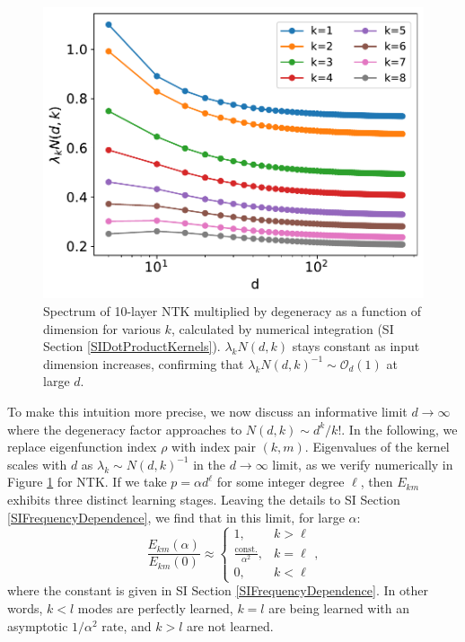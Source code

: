 \documentclass{article}
\begin{document}
\begin{figure}[tb]
\centering
\includegraphics[width=0.8
\linewidth]{ntk_spectrum_dim.pdf}
\caption{\label{fig:NTK_spectrum_dependence} Spectrum of 10-layer NTK multiplied by degeneracy as a function of dimension for various $k$, calculated by numerical integration (SI Section \ref{SIDotProductKernels}). $\lambda_k N(d,k)$ stays constant as input dimension increases, confirming that $\lambda_k N(d,k)^{-1}\sim \mathcal{O}_d(1)$ at large $d$.}
\end{figure}

To make this intuition more precise, we now discuss an informative limit $d\to\infty$ where the degeneracy factor approaches to $N(d,k) \sim {d^k}/{k!}$.  In the following, we replace eigenfunction index $\rho$ with index pair $(k,m)$. Eigenvalues of the kernel scales with $d$ as $\lambda_k \sim N(d,k)^{-1}$ \cite{smola2001dotproduct} in the $d \to \infty$ limit, as we verify numerically in Figure \ref{fig:NTK_spectrum_dependence} for NTK. If %
we take $p=\alpha d^\ell$ for some integer degree $\ell$, then $E_{km}$  exhibits three distinct learning stages. Leaving the details to SI Section \ref{SIFrequencyDependence},
we find that in this limit, for large $\alpha$:
\begin{equation}
\frac{E_{km}(\alpha)}{E_{km}(0)} \approx \left\{\begin{array}{ll}1,& k>\ell \\
 \frac{\text{const.}}{\alpha^2} ,& k=\ell \\
0, & k<\ell\end{array} \right.,
\end{equation}
where the constant is given in SI Section \ref{SIFrequencyDependence}. In other words, $k < l$ modes are perfectly learned, $k = l$ are being learned with an asymptotic $1/\alpha^2$ rate, and  $k > l$ are not learned.    
\end{document}
